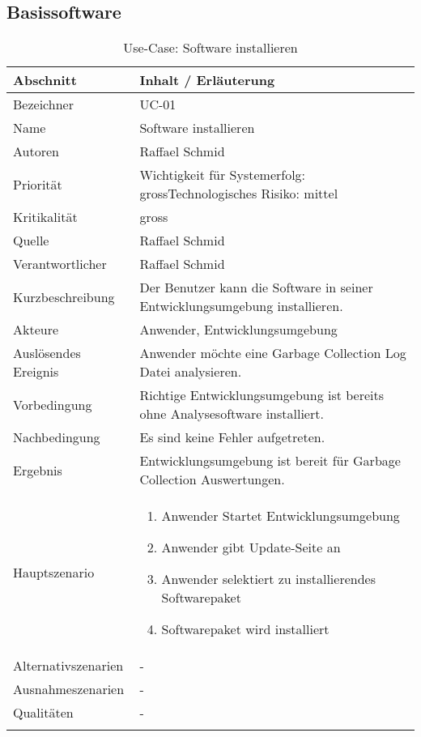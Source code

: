 \subsection{Basissoftware}
\begin{longtable}{|p{4cm}|p{10.5cm}|}
  \hline
   \textbf{Abschnitt} & \textbf{Inhalt / Erläuterung} \\\hline
   Bezeichner & UC-01\\\hline
   Name & Software installieren\\\hline
   Autoren & Raffael Schmid\\\hline
   Priorität & Wichtigkeit für Systemerfolg: gross\newline Technologisches Risiko: mittel\\\hline
   Kritikalität & gross\\\hline
   Quelle & Raffael Schmid\\\hline
   Verantwortlicher & Raffael Schmid\\\hline
   Kurzbeschreibung & Der Benutzer kann die Software in seiner Entwicklungsumgebung installieren.\\\hline
   Akteure & Anwender, Entwicklungsumgebung\\\hline
   Auslösendes Ereignis & Anwender möchte eine Garbage Collection Log Datei analysieren.\\\hline
   Vorbedingung & Richtige Entwicklungsumgebung ist bereits ohne Analysesoftware installiert.\\\hline
   Nachbedingung & Es sind keine Fehler aufgetreten.\\\hline
   Ergebnis & Entwicklungsumgebung ist bereit für Garbage Collection Auswertungen.\\\hline
   Hauptszenario & 
         \begin{enumerate}
		\item Anwender Startet Entwicklungsumgebung
		\item Anwender gibt Update-Seite an
		\item Anwender selektiert zu installierendes Softwarepaket
		\item Softwarepaket wird installiert	
 	\end{enumerate}
	\\\hline
   Alternativszenarien & -\\\hline
   Ausnahmeszenarien & -\\\hline
   Qualitäten & -\\\hline
\caption{Use-Case: Software installieren}
\end{longtable}

